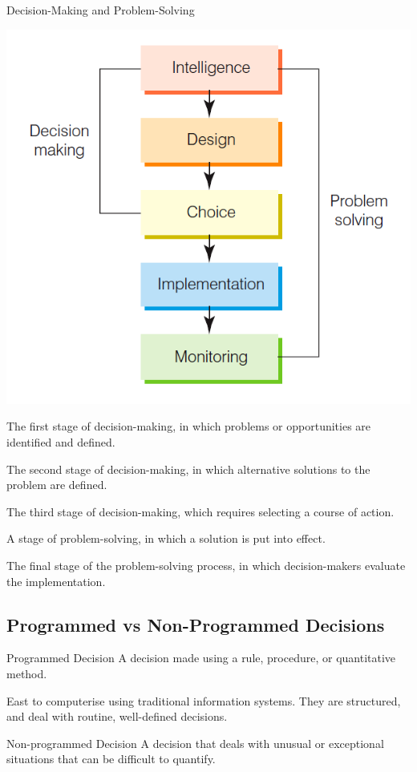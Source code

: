 \documentclass[\main/notes.tex]{subfiles}
\begin{document}
			\begin{sidenote}{Decision-Making and Problem-Solving}
				\begin{minipage}{0.39\textwidth}
					\includegraphics[width=0.9\linewidth]{chapter08/decision_making.png}
				\end{minipage}
				\begin{minipage}{0.6\textwidth}
					\begin{description}[]
						\item[Intelligence Stage] The first stage of decision-making, in which problems or opportunities are identified and defined.
						\item[Design Stage] The second stage of decision-making, in which alternative solutions to the problem are defined.
						\item[Choice Stage] The third stage of decision-making, which requires selecting a course of action.
						\item[Implementation Stage] A stage of problem-solving, in which a solution is put into effect.
						\item[Monitoring Stage] The final stage of the problem-solving process, in which decision-makers evaluate the implementation.
					\end{description}
				\end{minipage}
			\end{sidenote}
			\subsection{Programmed vs Non-Programmed Decisions}
				\begin{definition}{Programmed Decision}
					A decision made using a rule, procedure, or quantitative method.

					East to computerise using traditional information systems. They are structured, and deal with routine, well-defined decisions.
				\end{definition}
				\begin{definition}{Non-programmed Decision}
					A decision that deals with unusual or exceptional situations that can be difficult to quantify.
				\end{definition}
\end{document}
